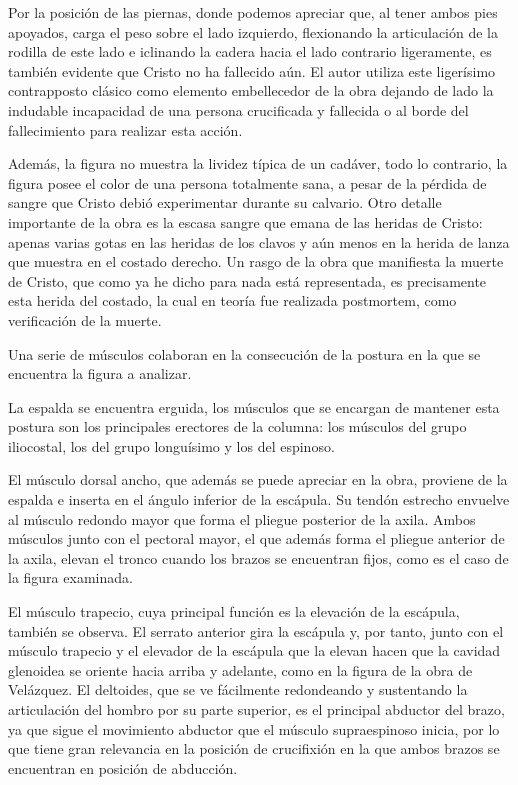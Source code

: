 Por la posición de las piernas, donde podemos apreciar que, al tener ambos pies apoyados, carga el peso sobre el lado izquierdo, flexionando la articulación de la rodilla de este lado e iclinando la cadera hacia el lado contrario ligeramente, es también evidente que Cristo no ha fallecido aún. El autor utiliza este ligerísimo contrapposto clásico como elemento embellecedor de la obra dejando de lado la indudable incapacidad de una persona crucificada y fallecida o al borde del fallecimiento para realizar esta acción.

Además, la figura no muestra la lividez típica de un cadáver, todo lo contrario, la figura posee el color de una persona totalmente sana, a pesar de la pérdida de sangre que Cristo debió experimentar durante su calvario. Otro detalle importante de la obra es la escasa sangre que emana de las heridas de Cristo: apenas varias gotas en las heridas de los clavos y aún menos en la herida de lanza que muestra en el costado derecho. Un rasgo de la obra que  manifiesta la muerte de Cristo, que como ya he dicho para nada está representada, es precisamente esta herida del costado, la cual en teoría fue realizada postmortem, como verificación de la muerte.

Una serie de músculos colaboran en la consecución de la postura en la que se encuentra la figura a analizar.

La espalda se encuentra erguida, los músculos que se encargan de mantener esta postura son los principales erectores de la columna: los músculos del grupo iliocostal, los del grupo longuísimo y los del espinoso.

El músculo dorsal ancho, que además se puede apreciar en la obra, proviene de la espalda e inserta en el ángulo inferior de la escápula. Su tendón estrecho envuelve al músculo redondo mayor que forma el pliegue posterior de la axila. Ambos músculos junto con el pectoral mayor, el que además forma el pliegue anterior de la axila, elevan el tronco cuando los brazos se encuentran fijos, como es el caso de la figura examinada.

El músculo trapecio, cuya principal función es la elevación de la escápula, también se observa. El serrato anterior gira la escápula y, por tanto, junto con el músculo trapecio y el elevador de la escápula que la elevan hacen que la cavidad glenoidea se oriente hacia arriba y adelante, como en la figura de la obra de Velázquez.
El deltoides, que se ve fácilmente redondeando y sustentando la articulación del hombro por su parte superior, es el principal abductor del brazo, ya que sigue el movimiento abductor que el músculo supraespinoso inicia, por lo que tiene gran relevancia en la posición de crucifixión en la que ambos brazos se encuentran en posición de abducción.

